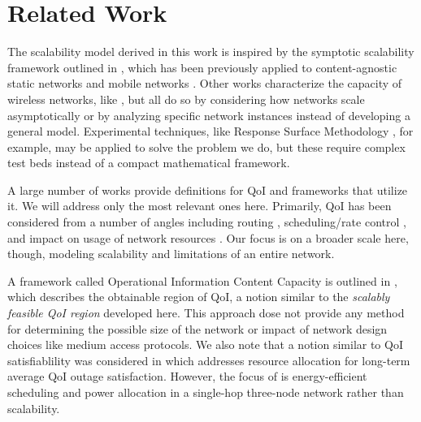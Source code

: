 \section{Related Work}
\label{sec:related_work}

The scalability model derived in this work is inspired by the symptotic scalability framework outlined in \cite{symptotics_journal}, which has been previously applied to content-agnostic static networks \cite{symptotics_framework_scalability} and mobile networks \cite{scal_analysis_mobility}.  Other works characterize the capacity of wireless networks, like \cite{li_capacity, gupta2000capacity}, but all do so by considering how networks scale asymptotically or by analyzing specific network instances instead of developing a general model.  Experimental techniques, like Response Surface Methodology \cite{khuri2010response}, for example, may be applied to solve the problem we do, but these require complex test beds instead of a compact mathematical framework.

A large number of works provide definitions for QoI and frameworks that utilize it.  We will address only the most relevant ones here.  Primarily, QoI has been considered from a number of angles including routing \cite{quality_aware_routing_tan}, scheduling/rate control \cite{toward_qoi_rate_control,explor_vs_exploit}, and impact on usage of network resources \cite{qoi_aware_mobile_apps}. Our focus is on a broader scale here, though, modeling scalability and limitations of an entire network.


A framework called Operational Information Content Capacity is outlined in \cite{oicc_journal}, which describes the obtainable region of QoI, a notion similar to the \emph{scalably feasible QoI region} developed here.  This approach dose not provide any method for determining the possible size of the network or impact of network design choices like medium access protocols.  We also note that a notion similar to QoI satisfiablility was considered in \cite{qoi_outage} which addresses resource allocation for long-term average QoI outage satisfaction.  However, the focus of \cite{qoi_outage} is energy-efficient scheduling and power allocation in a single-hop three-node network rather than scalability.  

